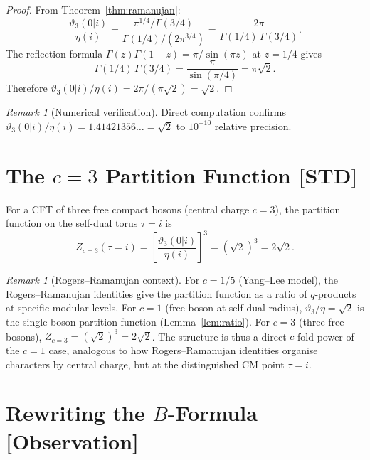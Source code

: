 \documentclass[12pt,a4paper]{article}
\theoremstyle{remark}
\newtheorem{remark}[theorem]{Remark}
\newcommand{\STD}{\textbf{[STD]}}
\newcommand{\OBS}{\textbf{[Observation]}}
\begin{document}
\begin{proof}
From Theorem~\ref{thm:ramanujan}:
\[
\frac{\vartheta_3(0|i)}{\eta(i)}
= \frac{\pi^{1/4}/\Gamma(3/4)}{\Gamma(1/4)/(2\pi^{3/4})}
= \frac{2\pi}{\Gamma(1/4)\,\Gamma(3/4)}.
\]
The reflection formula $\Gamma(z)\Gamma(1-z)=\pi/\sin(\pi z)$ at $z=1/4$
gives
\[
\Gamma(1/4)\,\Gamma(3/4) = \frac{\pi}{\sin(\pi/4)} = \pi\sqrt{2}.
\]
Therefore $\vartheta_3(0|i)/\eta(i) = 2\pi/(\pi\sqrt{2}) = \sqrt{2}$.
\end{proof}

\begin{remark}[Numerical verification]
Direct computation confirms $\vartheta_3(0|i)/\eta(i) = 1.41421356\ldots = \sqrt{2}$
to $10^{-10}$ relative precision.
\end{remark}

\section{The $c=3$ Partition Function \STD}
\label{sec:c3}

For a CFT of three free compact bosons (central charge $c=3$),
the partition function on the self-dual torus $\tau=i$ is
\begin{equation}
  Z_{c=3}(\tau=i)
  = \left[\frac{\vartheta_3(0|i)}{\eta(i)}\right]^3
  = (\sqrt{2})^3
  = 2\sqrt{2}.
  \label{eq:Zc3}
\end{equation}

\begin{remark}[Rogers--Ramanujan context]
For $c=1/5$ (Yang--Lee model), the Rogers--Ramanujan identities give the
partition function as a ratio of $q$-products at specific modular levels.
For $c=1$ (free boson at self-dual radius), $\vartheta_3/\eta = \sqrt{2}$
is the single-boson partition function (Lemma~\ref{lem:ratio}).
For $c=3$ (three free bosons), $Z_{c=3} = (\sqrt{2})^3 = 2\sqrt{2}$.
The structure is thus a direct $c$-fold power of the $c=1$ case,
analogous to how Rogers--Ramanujan identities organise characters
by central charge, but at the distinguished CM point $\tau=i$.
\end{remark}

\section{Rewriting the $B$-Formula \OBS}
\label{sec:B}
\end{document}
